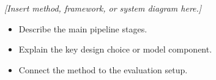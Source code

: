 \centering
\vspace{1.0cm}
\textit{[Insert method, framework, or system diagram here.]}

\vspace{1.0cm}
\begin{itemize}
    \item Describe the main pipeline stages.
    \item Explain the key design choice or model component.
    \item Connect the method to the evaluation setup.
\end{itemize}
